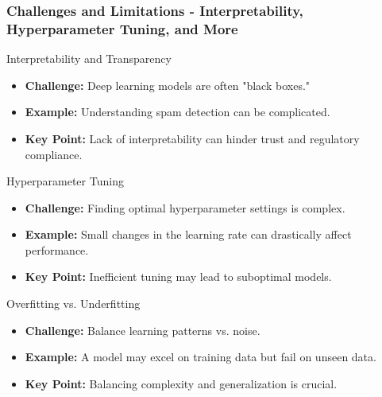 \documentclass[aspectratio=169]{beamer}
\begin{document}
\begin{frame}[fragile]
    \frametitle{Challenges and Limitations - Interpretability, Hyperparameter Tuning, and More}
    \begin{block}{Interpretability and Transparency}
        \begin{itemize}
            \item \textbf{Challenge:} Deep learning models are often "black boxes."
            \item \textbf{Example:} Understanding spam detection can be complicated.
            \item \textbf{Key Point:} Lack of interpretability can hinder trust and regulatory compliance.
        \end{itemize}
    \end{block}

    \begin{block}{Hyperparameter Tuning}
        \begin{itemize}
            \item \textbf{Challenge:} Finding optimal hyperparameter settings is complex.
            \item \textbf{Example:} Small changes in the learning rate can drastically affect performance.
            \item \textbf{Key Point:} Inefficient tuning may lead to suboptimal models.
        \end{itemize}
    \end{block}

    \begin{block}{Overfitting vs. Underfitting}
        \begin{itemize}
            \item \textbf{Challenge:} Balance learning patterns vs. noise.
            \item \textbf{Example:} A model may excel on training data but fail on unseen data.
            \item \textbf{Key Point:} Balancing complexity and generalization is crucial.
        \end{itemize}
    \end{block}
\end{frame}
\end{document}
